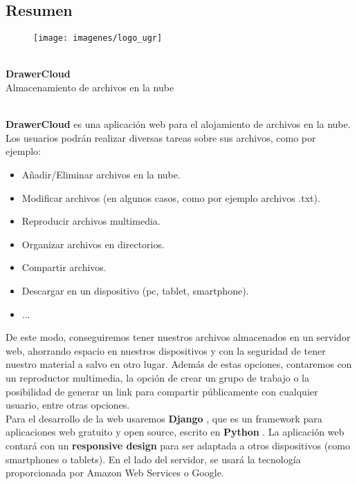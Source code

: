 \subsection{Resumen}
\hfill
\begin{figure}[h]
	\centering
	\texttt{[image: imagenes/logo\_ugr]}
\end{figure}
\hfill
\begin{center}
	\horrule{0.5pt} \\[0.4cm] %
	\huge \textbf{DrawerCloud} \\ %
	\Large Almacenamiento de archivos en la nube \\ %
	\horrule{2pt} \\[0.5cm] %
\end{center}

\hfill

\textbf{DrawerCloud} es una aplicación web para el alojamiento de archivos en la nube. Los usuarios podrán realizar diversas tareas sobre sus archivos, como por ejemplo: 
\begin{itemize}
	\item Añadir/Eliminar archivos en la nube.
	\item Modificar archivos (en algunos casos, como por ejemplo archivos .txt).
	\item Reproducir archivos multimedia.
	\item Organizar archivos en directorios.
	\item Compartir archivos.
	\item Descargar en un dispositivo (pc, tablet, smartphone).
	\item ...
\end{itemize}
De este modo, conseguiremos tener nuestros archivos almacenados en un servidor web, ahorrando espacio en nuestros dispositivos y con la seguridad de tener nuestro material a salvo en otro lugar. Además de estas opciones, contaremos con un reproductor multimedia, la opción de crear un grupo de trabajo o la posibilidad de generar un link para compartir públicamente con cualquier usuario, entre otras opciones. \\

Para el desarrollo de la web usaremos \textbf{Django} \cite{cita1}, que es un framework para aplicaciones web gratuito y open source, escrito en \textbf{Python} \cite{cita2}. La aplicación web contará con un \textbf{responsive design} para ser adaptada a otros dispositivos (como smartphones o tablets). En el lado del servidor, se usará la tecnología proporcionada por Amazon Web Services o Google.\\

